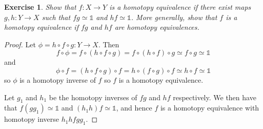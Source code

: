 \documentclass{article}
\newtheorem{exercise}{Exercise}[subsection]
\begin{document}
\begin{exercise}
Show that $f:X\to Y$ is a homotopy equivalence if there exist maps $g,h:Y\to X$ such that $fg\simeq\mathbb{1}$ and $hf\simeq\mathbb{1}$. More generally, show that $f$ is a homotopy equivalence if $fg$ and $hf$ are homotopy equivalences.
\end{exercise}
\begin{proof}
Let $\phi=h\circ f\circ g:Y\to X$. Then\[f\circ\phi=f\circ(h\circ f\circ g)=f\circ(h\circ f)\circ g\simeq f\circ g\simeq\mathbb{1}\] and\[\phi\circ f=(h\circ f\circ g)\circ f=h\circ(f\circ g)\circ f\simeq h\circ f\simeq\mathbb{1}\] so $\phi$ is a homotopy inverse of $f$ so $f$ is a homotopy equivalence.

Let $g_1$ and $h_1$ be the homotopy inverses of $fg$ and $hf$ respectively. We then have that $f(gg_1)\simeq\mathbb{1}$ and $(h_1h)f\simeq\mathbb{1}$, and hence $f$ is a homotopy equivalence with homotopy inverse $h_1hfgg_1$.
\end{proof}
\end{document}
